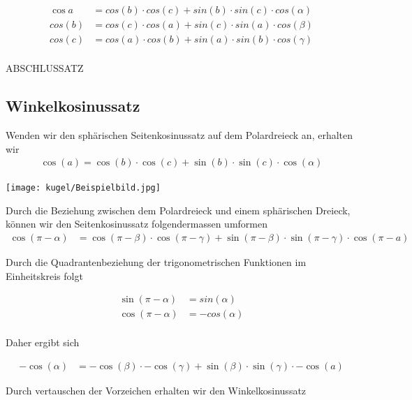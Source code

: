 \begin{refsection}
\begin{align*}
{\cos a} &= {cos(b)} \cdot {cos(c)} + {sin(b)} \cdot {sin(c)} \cdot {cos(\alpha)}\\
{cos(b)} &= {cos(c)} \cdot {cos(a)} + {sin (c)} \cdot {sin(a)} \cdot {cos(\beta)}\\
{cos(c)} &= {cos(a)} \cdot {cos(b)} + {sin(a)} \cdot {sin(b)} \cdot {cos(\gamma)}\\
\end{align*}


ABSCHLUSSATZ

\subsection{Winkelkosinussatz}

Wenden wir den sphärischen Seitenkosinussatz auf dem Polardreieck an, erhalten wir
\begin{align*}
{\cos (a)} = {\cos (b)} \cdot {\cos (c)} + {\sin(b)} \cdot {\sin(c)} \cdot {\cos (\alpha)}
\end{align*}

\begin{center}
        \texttt{[image: kugel/Beispielbild.jpg]}
\end{center}

Durch die Beziehung zwischen dem Polardreieck und einem sphärischen Dreieck, können wir den Seitenkosinussatz folgendermassen umformen
\begin{align*}
{\cos (\pi-\alpha)} &= {\cos (\pi-\beta)} \cdot {\cos (\pi-\gamma)} + {\sin(\pi-\beta)} \cdot {\sin(\pi-\gamma)} \cdot {\cos (\pi-a)}
\end{align*}

Durch die Quadrantenbeziehung der trigonometrischen Funktionen im Einheitskreis folgt

\begin{align*}
\sin (\pi-\alpha) &= sin(\alpha)\\
\cos (\pi-\alpha) &= - cos (\alpha)\\
\end{align*}

Daher ergibt sich

\begin{align*}
{-\cos (\alpha)} &= {-\cos (\beta)} \cdot {-\cos (\gamma)} + {\sin(\beta)} \cdot {\sin(\gamma)} \cdot {-\cos (a)}
\end{align*}

Durch vertauschen der Vorzeichen erhalten wir den Winkelkosinussatz


\end{refsection}
